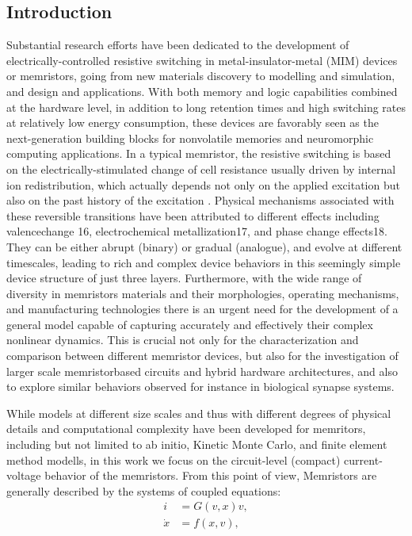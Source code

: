 \documentclass{article}
\begin{document}
{\begin{multicols}{2}
{\section{Introduction}
}
Substantial research efforts have been dedicated to the
development of electrically-controlled resistive switching in metal-insulator-metal (MIM) devices or memristors, going from new materials discovery to modelling and simulation, and design and applications.
With both memory and logic capabilities combined at
the hardware level, in addition to long retention times
and high switching rates at relatively low energy
consumption, these devices are favorably seen as the
next-generation building blocks for nonvolatile memories and neuromorphic computing applications. In
a typical memristor, the resistive switching is based on
the electrically-stimulated change of cell resistance usually driven by internal ion redistribution, which actually depends not only on the applied excitation but also
on the past history of the excitation
. Physical mechanisms associated with these reversible transitions have
been attributed to different effects including valencechange 16, electrochemical metallization17, and phase
change effects18. They can be either abrupt (binary)
or gradual (analogue), and evolve at different timescales,
leading to rich and complex device behaviors in this seemingly simple device structure of just three layers. Furthermore, with the wide range of diversity in memristors
materials and their morphologies, operating mechanisms,
and manufacturing technologies there is an urgent need
for the development of a general model capable of capturing accurately and effectively their complex nonlinear
dynamics. This is crucial not only for the characterization and comparison between different memristor devices,
but also for the investigation of larger scale memristorbased circuits and hybrid hardware architectures, and
also to explore similar behaviors observed for instance in
biological synapse systems.
\par
While models at different size scales and thus with different degrees of physical details and computational complexity have been developed for memritors, including but not limited to ab initio, Kinetic Monte Carlo, and finite element method modells, in this work we focus on the circuit-level (compact) current-voltage behavior of the memristors. From this point of view, Memristors are generally described by the systems of coupled equations: 
\begin{align}
     i &= G(v,x)v, \\
     \dot{x} &= f(x,v),
\end{align}


\end{multicols}}
\end{document}
